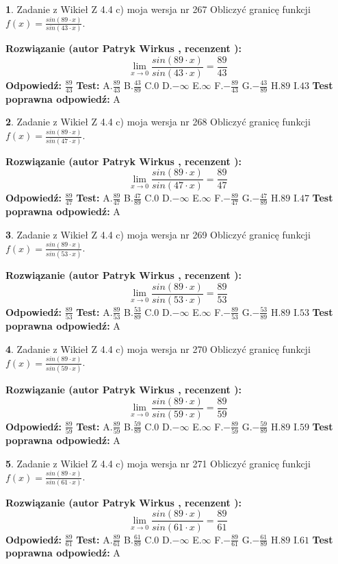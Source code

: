 \documentclass[12pt, a4paper]{article}
\theoremstyle{definition} %
\newtheorem{zad}{}
\newcommand{\zadStart}[1]{\begin{zad}#1\newline}
\newcommand{\zadStop}{\end{zad}}
\newcommand{\rozwStart}[2]{\noindent \textbf{Rozwiązanie (autor #1 , recenzent #2): }\newline}
\newcommand{\rozwStop}{\newline}
\newcommand{\odpStart}{\noindent \textbf{Odpowiedź:}\newline}
\newcommand{\odpStop}{\newline}
\newcommand{\testStart}{\noindent \textbf{Test:}\newline}
\newcommand{\testStop}{\newline}
\newcommand{\kluczStart}{\noindent \textbf{Test poprawna odpowiedź:}\newline}
\newcommand{\kluczStop}{\newline}
\begin{document}
\zadStart{Zadanie z Wikieł Z 4.4 c) moja wersja nr 267}
Obliczyć granicę funkcji $f(x)=\frac{sin(89\cdot x)}{sin(43\cdot x)}$.
\zadStop
\rozwStart{Patryk Wirkus}{}
$$\lim\limits_{x\to 0}\frac{sin(89\cdot x)}{sin(43\cdot x)}=
\frac{89}{43}$$
\rozwStop
\odpStart
$\frac{89}{43}$
\odpStop
\testStart
A.$\frac{89}{43}$
B.$\frac{43}{89}$
C.$0$
D.$-\infty$
E.$\infty$
F.$-\frac{89}{43}$
G.$-\frac{43}{89}$
H.$89$
I.$43$
\testStop
\kluczStart
A
\kluczStop



\zadStart{Zadanie z Wikieł Z 4.4 c) moja wersja nr 268}
Obliczyć granicę funkcji $f(x)=\frac{sin(89\cdot x)}{sin(47\cdot x)}$.
\zadStop
\rozwStart{Patryk Wirkus}{}
$$\lim\limits_{x\to 0}\frac{sin(89\cdot x)}{sin(47\cdot x)}=
\frac{89}{47}$$
\rozwStop
\odpStart
$\frac{89}{47}$
\odpStop
\testStart
A.$\frac{89}{47}$
B.$\frac{47}{89}$
C.$0$
D.$-\infty$
E.$\infty$
F.$-\frac{89}{47}$
G.$-\frac{47}{89}$
H.$89$
I.$47$
\testStop
\kluczStart
A
\kluczStop



\zadStart{Zadanie z Wikieł Z 4.4 c) moja wersja nr 269}
Obliczyć granicę funkcji $f(x)=\frac{sin(89\cdot x)}{sin(53\cdot x)}$.
\zadStop
\rozwStart{Patryk Wirkus}{}
$$\lim\limits_{x\to 0}\frac{sin(89\cdot x)}{sin(53\cdot x)}=
\frac{89}{53}$$
\rozwStop
\odpStart
$\frac{89}{53}$
\odpStop
\testStart
A.$\frac{89}{53}$
B.$\frac{53}{89}$
C.$0$
D.$-\infty$
E.$\infty$
F.$-\frac{89}{53}$
G.$-\frac{53}{89}$
H.$89$
I.$53$
\testStop
\kluczStart
A
\kluczStop



\zadStart{Zadanie z Wikieł Z 4.4 c) moja wersja nr 270}
Obliczyć granicę funkcji $f(x)=\frac{sin(89\cdot x)}{sin(59\cdot x)}$.
\zadStop
\rozwStart{Patryk Wirkus}{}
$$\lim\limits_{x\to 0}\frac{sin(89\cdot x)}{sin(59\cdot x)}=
\frac{89}{59}$$
\rozwStop
\odpStart
$\frac{89}{59}$
\odpStop
\testStart
A.$\frac{89}{59}$
B.$\frac{59}{89}$
C.$0$
D.$-\infty$
E.$\infty$
F.$-\frac{89}{59}$
G.$-\frac{59}{89}$
H.$89$
I.$59$
\testStop
\kluczStart
A
\kluczStop



\zadStart{Zadanie z Wikieł Z 4.4 c) moja wersja nr 271}
Obliczyć granicę funkcji $f(x)=\frac{sin(89\cdot x)}{sin(61\cdot x)}$.
\zadStop
\rozwStart{Patryk Wirkus}{}
$$\lim\limits_{x\to 0}\frac{sin(89\cdot x)}{sin(61\cdot x)}=
\frac{89}{61}$$
\rozwStop
\odpStart
$\frac{89}{61}$
\odpStop
\testStart
A.$\frac{89}{61}$
B.$\frac{61}{89}$
C.$0$
D.$-\infty$
E.$\infty$
F.$-\frac{89}{61}$
G.$-\frac{61}{89}$
H.$89$
I.$61$
\testStop
\kluczStart
A
\kluczStop
\end{document}
